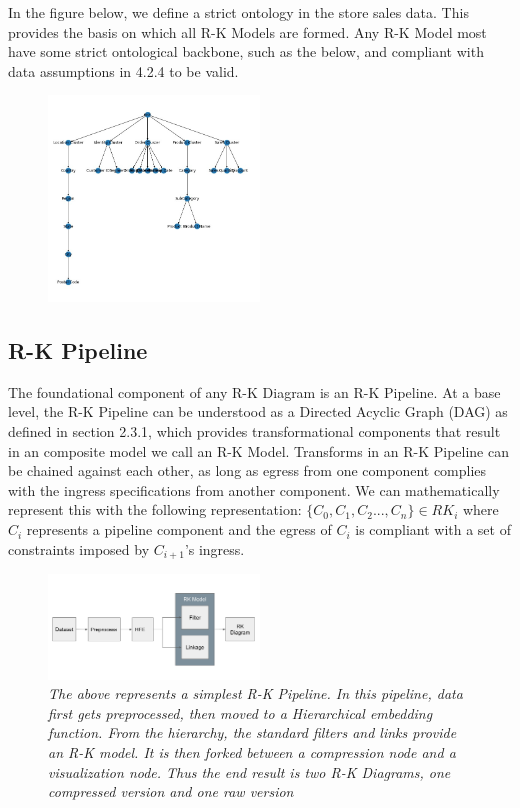 In the figure below, we define a strict ontology in the store sales data. This provides the basis on which all R-K Models are formed. Any R-K Model most have some strict ontological backbone, such as the below, and compliant with data assumptions in 4.2.4 to be valid.

\begin{figure}
	\centering
        \includegraphics[width=0.5\textwidth]{images/ss_dendrogram.png}
	\caption{\textit{}}
	\label{fig:ss_dendrogram}
\end{figure}


\subsection{R-K Pipeline}

The foundational component of any R-K Diagram is an R-K Pipeline. At a base level, the R-K Pipeline can be understood as a Directed Acyclic Graph (DAG) as defined in section 2.3.1, which provides transformational components that result in an composite model we call an R-K Model. Transforms in an R-K Pipeline can be chained against each other, as long as egress from one component complies with the ingress specifications from another component. We can mathematically represent this with the following representation: $\lbrace C_{0}, C_{1}, C_{2}..., C_{n} \rbrace \in RK_{i} $ where $C_{i}$ represents a pipeline component and the egress of $C_{i}$ is compliant with a set of constraints imposed by $C_{i+1}$'s ingress.
\begin{figure}
	\centering
        \includegraphics[width=0.5\textwidth]{images/simpliest_pipeline.png}
	\caption{\textit{The above represents a simplest R-K Pipeline. In this pipeline, data first gets preprocessed, then moved to a Hierarchical embedding function. From the hierarchy, the standard filters and links provide an R-K model. It is then forked between a compression node and a visualization node. Thus the end result is two R-K Diagrams, one compressed version and one raw version}}
	\label{fig:simpliest_pipeline}
\end{figure}

